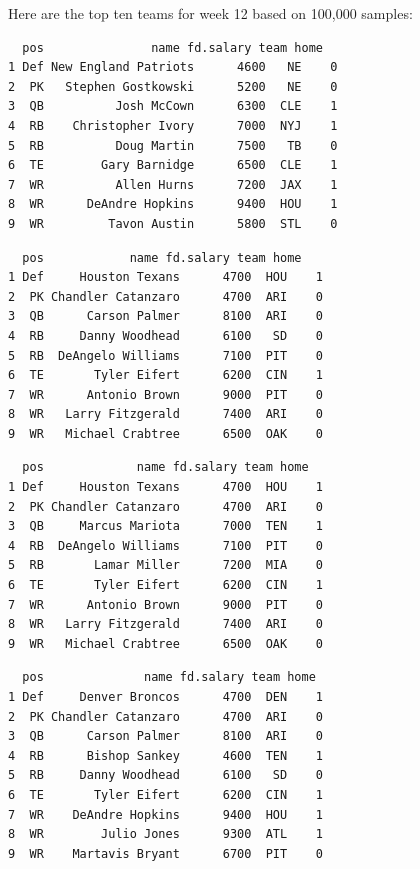 \documentclass[10pt]{article}
\begin{document}
\thispagestyle{fancy}


\noindent Here are the top ten teams for week 12 based on 100,000 samples:
\begin{lstlisting}
  pos               name fd.salary team home
1 Def New England Patriots      4600   NE    0
2  PK   Stephen Gostkowski      5200   NE    0
3  QB          Josh McCown      6300  CLE    1
4  RB    Christopher Ivory      7000  NYJ    1
5  RB          Doug Martin      7500   TB    0
6  TE        Gary Barnidge      6500  CLE    1
7  WR          Allen Hurns      7200  JAX    1
8  WR      DeAndre Hopkins      9400  HOU    1
9  WR         Tavon Austin      5800  STL    0
\end{lstlisting}

\begin{lstlisting}
  pos            name fd.salary team home
1 Def     Houston Texans      4700  HOU    1
2  PK Chandler Catanzaro      4700  ARI    0
3  QB      Carson Palmer      8100  ARI    0
4  RB     Danny Woodhead      6100   SD    0
5  RB  DeAngelo Williams      7100  PIT    0
6  TE       Tyler Eifert      6200  CIN    1
7  WR      Antonio Brown      9000  PIT    0
8  WR   Larry Fitzgerald      7400  ARI    0
9  WR   Michael Crabtree      6500  OAK    0
\end{lstlisting}

\begin{lstlisting}
  pos             name fd.salary team home
1 Def     Houston Texans      4700  HOU    1
2  PK Chandler Catanzaro      4700  ARI    0
3  QB     Marcus Mariota      7000  TEN    1
4  RB  DeAngelo Williams      7100  PIT    0
5  RB       Lamar Miller      7200  MIA    0
6  TE       Tyler Eifert      6200  CIN    1
7  WR      Antonio Brown      9000  PIT    0
8  WR   Larry Fitzgerald      7400  ARI    0
9  WR   Michael Crabtree      6500  OAK    0
\end{lstlisting}

\begin{lstlisting}
  pos              name fd.salary team home
1 Def     Denver Broncos      4700  DEN    1
2  PK Chandler Catanzaro      4700  ARI    0
3  QB      Carson Palmer      8100  ARI    0
4  RB      Bishop Sankey      4600  TEN    1
5  RB     Danny Woodhead      6100   SD    0
6  TE       Tyler Eifert      6200  CIN    1
7  WR    DeAndre Hopkins      9400  HOU    1
8  WR        Julio Jones      9300  ATL    1
9  WR    Martavis Bryant      6700  PIT    0
\end{lstlisting}
\end{document}
